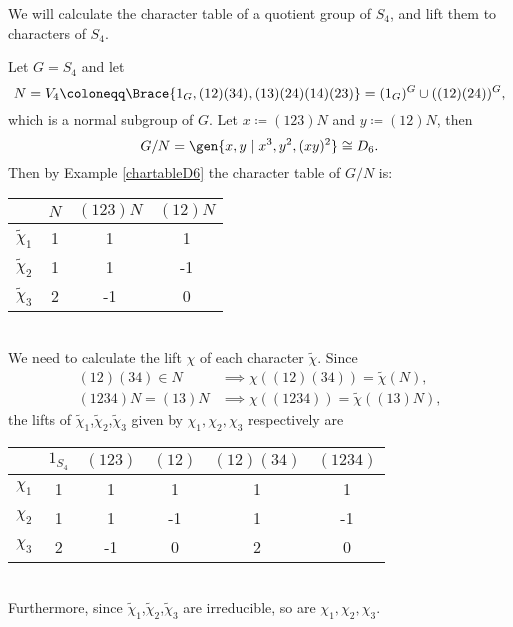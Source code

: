 \documentclass[../Project.tex]{subfiles}
\begin{document}
We will calculate the character table of a quotient group of $S_4$, and lift them to characters of $S_4$.

\begin{exam}
\label{charliftofS4}
	Let $G = S_4$ and let
	$$N = V_4 \coloneqq \Brace{1_{G},(12)(34),(13)(24)(14)(23)} = (1_G)^{G}\cup((12)(24))^{G},$$
	which is a normal subgroup of $G$. Let $x \coloneqq (123)N$ and $y \coloneqq (12)N$, then
	$$G/N = \gen{x,y\;\vert\;x^3,y^2,(xy)^2} \cong D_6.$$
	Then by Example \ref{chartableD6} the character table of $G/N$ is:\\

	\begin{minipage}{\linewidth}
\centering
	\begin{tabular}{c | c  c  c}
		  $ $ & $N$ & $(123)N$ & $(12)N$\\
	\hline
		$\tilde\chi_1$ & 1 & 1 & 1 \\
		$\tilde\chi_2$ & 1 & 1 & -1 \\
		$\tilde\chi_3$ & 2 & -1 & 0 \\
	\hline
	\end{tabular}
	\end{minipage}\\

We need to calculate the lift $\chi$ of each character $\tilde\chi$. Since
\begin{align*}
	(12)(34) \in N &\implies \chi((12)(34)) = \tilde\chi(N),\\
	(1234)N = (13)N &\implies \chi((1234)) = \tilde\chi((13)N),
\end{align*}
the lifts of $\tilde\chi_1$,$\tilde\chi_2$,$\tilde\chi_3$ given by $\chi_1,\chi_2,\chi_3$ respectively are\\

	\begin{minipage}{\linewidth}
\centering
	\begin{tabular}{c | c  c  c  c  c}
		  $ $ & $1_{S_4}$ & $(123)$ & $(12)$ & $(12)(34)$ & $(1234)$\\
	\hline
		$\chi_1$ & 1 & 1 & 1 & 1 & 1\\
		$\chi_2$ & 1 & 1 & -1 & 1 & -1\\
		$\chi_3$ & 2 & -1 & 0 & 2 & 0\\
	\hline
	\end{tabular}
	\end{minipage}\\

Furthermore, since $\tilde\chi_1$,$\tilde\chi_2$,$\tilde\chi_3$ are irreducible, so are $\chi_1,\chi_2,\chi_3$.
\end{exam}
\end{document}
